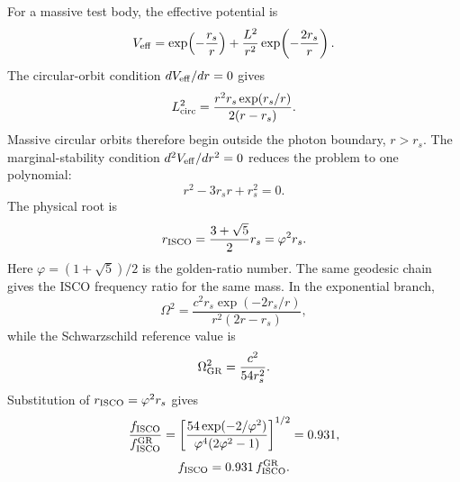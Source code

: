 \documentclass[12pt]{article}
\begin{document}
For a massive test body, the effective potential is
\begin{equation}
V_{\rm eff}=\exp\!\left(-\frac{r_s}{r}\right)
 +\frac{L^2}{r^2}\exp\!\left(-\frac{2r_s}{r}\right).
\end{equation}
The circular-orbit condition $dV_{\rm eff}/dr=0$ gives
\begin{equation}
L_{\rm circ}^2
=\frac{r^2r_s\exp(r_s/r)}{2(r-r_s)}.
\end{equation}
Massive circular orbits therefore begin outside the photon boundary, $r>r_s$. The marginal-stability condition $d^2V_{\rm eff}/dr^2=0$ reduces the problem to one polynomial:
\begin{equation}
r^2-3r_sr+r_s^2=0 .
\end{equation}
The physical root is
\begin{equation}
r_{\rm ISCO}
=\frac{3+\sqrt5}{2}r_s
=\varphi^2r_s .
\end{equation}
Here $\varphi=(1+\sqrt5)/2$ is the golden-ratio number.
The same geodesic chain gives the ISCO frequency ratio for the same mass. In the exponential branch,
\begin{equation}
\Omega^2=
\frac{c^2r_s\exp(-2r_s/r)}
{r^2(2r-r_s)} ,
\end{equation}
while the Schwarzschild reference value is
\begin{equation}
\Omega_{\rm GR}^2=\frac{c^2}{54r_s^2}.
\end{equation}
Substitution of $r_{\rm ISCO}=\varphi^2r_s$ gives
\begin{equation}
\frac{f_{\rm ISCO}}{f_{\rm ISCO}^{\rm GR}}
=\left[
\frac{54\exp(-2/\varphi^2)}
{\varphi^4(2\varphi^2-1)}
\right]^{1/2}
=0.931,
\end{equation}
\begin{equation}
f_{\rm ISCO}=0.931\,f_{\rm ISCO}^{\rm GR}.
\end{equation}
\end{document}

